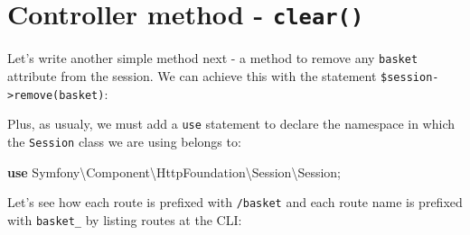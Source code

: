 \documentclass[a4paperpaper,openright]{book}
\newenvironment{Shaded}{}{}
\newcommand{\AnnotationTok}[1]{\textcolor[rgb]{0.38,0.63,0.69}{\textbf{\textit{#1}}}}
\newcommand{\CommentTok}[1]{\textcolor[rgb]{0.38,0.63,0.69}{\textit{#1}}}
\newcommand{\KeywordTok}[1]{\textcolor[rgb]{0.00,0.44,0.13}{\textbf{#1}}}
\newcommand{\NormalTok}[1]{#1}
\newcommand{\OtherTok}[1]{\textcolor[rgb]{0.00,0.44,0.13}{#1}}
\newcommand{\StringTok}[1]{\textcolor[rgb]{0.25,0.44,0.63}{#1}}
\begin{document}
\hypertarget{controller-method---clear}{%
\section{\texorpdfstring{Controller method -
\texttt{clear()}}{Controller method - clear()}}\label{controller-method---clear}}

Let's write another simple method next - a method to remove any
\texttt{basket} attribute from the session. We can achieve this with the
statement
\texttt{\$session-\textgreater{}remove(\textquotesingle{}basket\textquotesingle{})}:

\begin{Shaded}
\end{Shaded}

Plus, as usualy, we must add a \texttt{use} statement to declare the
namespace in which the \texttt{Session} class we are using belongs to:

\begin{Shaded}
\begin{Highlighting}[]
    \KeywordTok{use}\NormalTok{ Symfony\textbackslash{}Component\textbackslash{}HttpFoundation\textbackslash{}Session\textbackslash{}Session}\OtherTok{;}
\end{Highlighting}
\end{Shaded}

Let's see how each route is prefixed with \texttt{/basket} and each
route name is prefixed with \texttt{basket\_} by listing routes at the
CLI:
\end{document}

